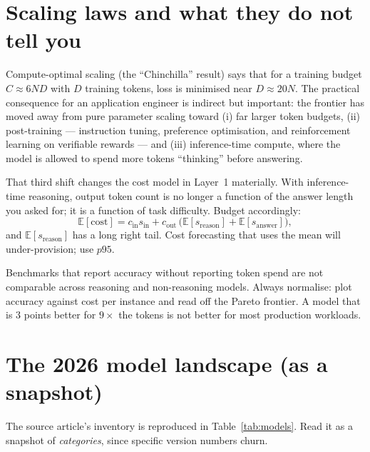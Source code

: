 \documentclass[11pt,twoside,openright]{book}
\theoremstyle{definition}
\theoremstyle{plain}
\theoremstyle{remark}
\newcommand{\E}{\mathbb{E}}
\begin{document}
\section{Scaling laws and what they do not tell you}

Compute-optimal scaling (the ``Chinchilla'' result) says that for a training
budget $C \approx 6ND$ with $D$ training tokens, loss is minimised near
$D \approx 20N$. The practical consequence for an application engineer is
indirect but important: the frontier has moved away from pure parameter scaling
toward (i) far larger token budgets, (ii) post-training --- instruction tuning,
preference optimisation, and reinforcement learning on verifiable rewards --- and
(iii) inference-time compute, where the model is allowed to spend more tokens
``thinking'' before answering.

That third shift changes the cost model in Layer~1 materially. With
inference-time reasoning, output token count is no longer a function of the
answer length you asked for; it is a function of task difficulty. Budget
accordingly:
\begin{equation}
  \E[\text{cost}] = c_{\text{in}} s_{\text{in}} + c_{\text{out}}\,\bigl(\E[s_{\text{reason}}] + \E[s_{\text{answer}}]\bigr),
\end{equation}
and $\E[s_{\text{reason}}]$ has a long right tail. Cost forecasting that uses the
mean will under-provision; use $p95$.

\begin{caution}
Benchmarks that report accuracy without reporting token spend are not
comparable across reasoning and non-reasoning models. Always normalise: plot
accuracy against cost per instance and read off the Pareto frontier. A model
that is $3$ points better for $9\times$ the tokens is not better for most
production workloads.
\end{caution}

\section{The 2026 model landscape (as a snapshot)}

The source article's inventory is reproduced in Table~\ref{tab:models}. Read it
as a snapshot of \emph{categories}, since specific version numbers churn.
\end{document}

